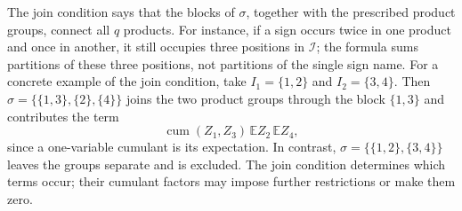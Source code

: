 \documentclass[11pt]{article}
\theoremstyle{definition}
\theoremstyle{remark}
\theoremstyle{plain}
\newcommand{\E}{\mathbb E}
\DeclareMathOperator{\cum}{cum}
\begin{document}
The join condition says that the blocks of $\sigma$, together with
the prescribed product groups, connect all $q$ products. For
instance, if a sign occurs twice in one product and once in another,
it still occupies three positions in $\mathcal I$; the formula
sums partitions of these three positions, not partitions of the
single sign name.
For a concrete example of the join condition, take
$I_1=\{1,2\}$ and $I_2=\{3,4\}$.
Then $\sigma=\{\{1,3\},\{2\},\{4\}\}$ joins the two product
groups through the block $\{1,3\}$ and contributes the term
\[
 \cum(Z_1,Z_3)\,\E Z_2\,\E Z_4,
\]
since a one-variable cumulant is its expectation. In contrast,
$\sigma=\{\{1,2\},\{3,4\}\}$ leaves the groups separate and is
excluded. The join condition determines which terms occur; their
cumulant factors may impose further restrictions or make them zero.
\end{document}
